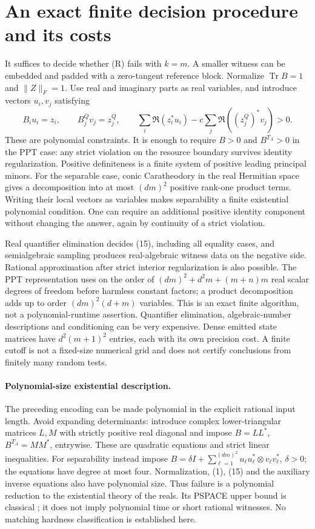 \documentclass[11pt]{article}
\newcommand{\Tr}{\operatorname{Tr}}
\begin{document}
\section{An exact finite decision procedure and its costs}
It suffices to decide whether (R) fails with $k=m$. A smaller witness can
be embedded and padded with a zero-tangent reference block. Normalize
$\Tr B=1$ and $\|Z\|_F=1$. Use real and imaginary parts as real variables,
and introduce vectors $u_i,v_j$ satisfying
\[
 B_i u_i=z_i,\qquad B_j^Q v_j=z_j^Q,\qquad
 \sum_i\Re(z_i^*u_i)-c\sum_j\Re((z_j^Q)^*v_j)>0.              \tag{15}
\]
These are polynomial constraints. It is enough to require $B>0$ and
$B^{T_A}>0$ in the PPT case: any strict violation on the resource boundary
survives identity regularization. Positive definiteness is a finite system
of positive leading principal minors. For the separable case, conic
Caratheodory in the real Hermitian space gives a decomposition into at most
$(dm)^2$ positive rank-one product terms. Writing their local vectors as
variables makes separability a finite existential polynomial condition.
One can require an additional positive identity component without changing
the answer, again by continuity of a strict violation.

Real quantifier elimination decides (15), including all equality cases, and
semialgebraic sampling produces real-algebraic witness data on the negative
side. Rational approximation after strict interior regularization is also
possible. The PPT representation uses on the order of
$(dm)^2+d^2m+(m+n)m$ real scalar degrees of freedom before harmless constant
factors; a product decomposition adds up to order $(dm)^2(d+m)$ variables.
This is an exact finite algorithm, not a polynomial-runtime assertion.
Quantifier elimination, algebraic-number descriptions and conditioning can
be very expensive. Dense emitted state matrices have $d^2(m+1)^2$ entries,
each with its own precision cost. A finite cutoff is not a fixed-size
numerical grid and does not certify conclusions from finitely many random
tests.

\paragraph{Polynomial-size existential description.}
The preceding encoding can be made polynomial in the explicit rational input
length. Avoid expanding determinants: introduce complex lower-triangular
matrices $L,M$ with strictly positive real diagonal and impose
$B=LL^*$, $B^{T_A}=MM^*$, entrywise. These are quadratic equations and strict
linear inequalities. For separability instead impose
$B=\delta I+\sum_{\ell=1}^{(dm)^2}
u_\ell u_\ell^*\otimes v_\ell v_\ell^*$, $\delta>0$; the equations have degree
at most four. Normalization, (1), (15) and the auxiliary inverse equations
also have polynomial size. Thus failure is a polynomial reduction to the
existential theory of the reals. Its PSPACE upper bound is classical
\cite{canny}; it does not imply polynomial time or short rational witnesses.
No matching hardness classification is established here.
\end{document}
